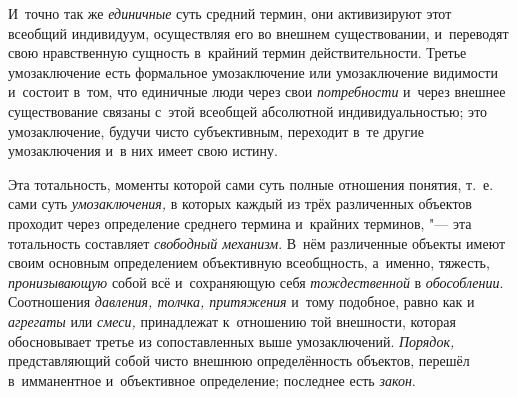 И~точно так же
{\em единичные} суть
средний термин, они активизируют этот всеобщий индивидуум, осуществляя его
во внешнем существовании, и~переводят свою нравственную сущность в~крайний
термин
действительности.
Третье умозаключение есть формальное умозаключение или
умозаключение видимости и~состоит в~том, что единичные люди через свои
{\em потребности} и~через
внешнее существование связаны с~этой всеобщей абсолютной индивидуальностью;
это умозаключение, будучи чисто субъективным, переходит в~те другие
умозаключения и~в них имеет свою
истину\label{bkm:bm52c}.

Эта тотальность, моменты которой сами суть полные отношения
понятия, т.~е. сами суть
{\em умозаключения,} в
которых каждый из трёх различенных объектов проходит через определение
среднего термина и~крайних терминов, "--- эта тотальность
составляет {\em свободный механизм}.
В~нём различенные объекты имеют своим основным определением
объективную всеобщность, а~именно, тяжесть,
{\em пронизывающую} собой
всё и~сохраняющую себя
{\em тождественной} в
{\em обособлении}.
Соотношения {\em давления,
толчка, притяжения} и~тому подобное, равно как и
{\em агрегаты} или
{\em смеси,} принадлежат
к~отношению той внешности, которая обосновывает третье из
сопоставленных выше умозаключений.
{\em Порядок,}
представляющий собой чисто внешнюю определённость объектов,
перешёл в~имманентное и~объективное определение; последнее есть
{\em закон}.


